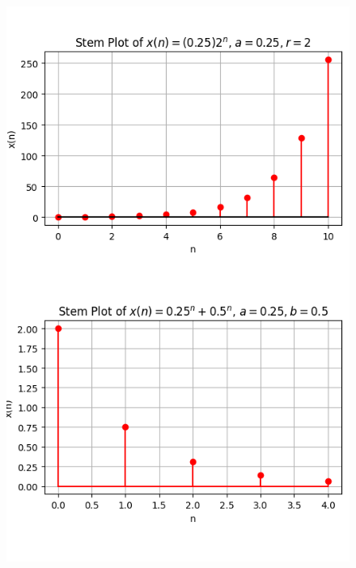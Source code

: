 \documentclass[journal,12pt,twocolumn]{IEEEtran}
\theoremstyle{remark}
\begin{document}
\begin{figure}[htbp]
   \centering
   \includegraphics[width=1\columnwidth]{figs/gp.png}
\end{figure}
\end{document}
